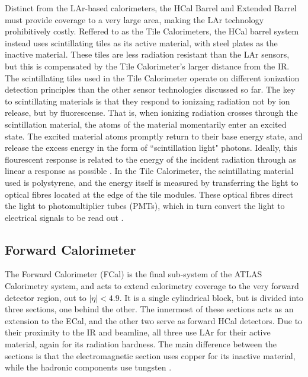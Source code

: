         Distinct from the LAr-based calorimeters, the HCal Barrel and Extended Barrel must provide coverage to a very large area, making the LAr technology prohibitively costly.
        Reffered to as the Tile Calorimeters, the HCal barrel system instead uses scintillating tiles as its active material, with steel plates as the inactive material.
        These tiles are less radiation resistant than the LAr sensors, but this is compensated by the Tile Calorimeter's larger distance from the IR.
        The scintillating tiles used in the Tile Calorimeter operate on different ionization detection principles than the other sensor technologies discussed so far.
        The key to scintillating materials is that they respond to ionizaing radiation not by ion release, but by fluorescense.
        That is, when ionizing radiation crosses through the scintillation material, the atoms of the material momentarily enter an excited state.
        The excited material atoms promptly return to their base energy state, and release the excess energy in the form of ``scintillation light" photons.
        Ideally, this flourescent response is related to the energy of the incident radiation through as linear a response as possible \cite{wiley_radiation_detection}.
        In the Tile Calorimeter, the scintillating material used is polystyrene, and the energy itself is measured by transferring the light to optical fibres located at the edge of the tile modules.
        These optical fibres direct the light to photomultiplier tubes (PMTs), which in turn convert the light to electrical signals to be read out \cite{tcal_tdr}.

    \subsection{Forward Calorimeter}
        The Forward Calorimeter (FCal) is the final sub-system of the ATLAS Calorimetry system, and acts to extend calorimetry coverage to the very forward detector region, out to $|\eta| < 4.9$.
        It is a single cylindrical block, but is divided into three sections, one behind the other.
        The innermost of these sections acts as an extension to the ECal, and the other two serve as forward HCal detectors.
        Due to their proximity to the IR and beamline, all three use LAr for their active material, again for its radiation hardness.
        The main difference between the sections is that the electromagnetic section uses copper for its inactive material, while the hadronic components use tungsten \cite{Lar_cal_tdr}.

